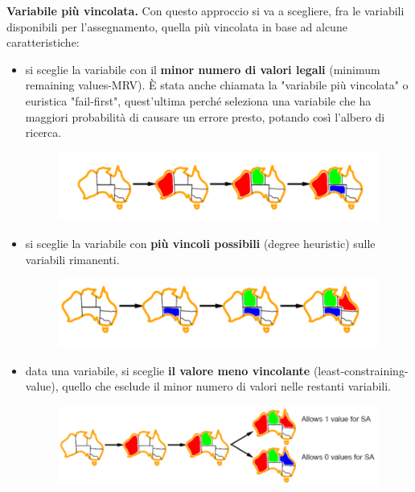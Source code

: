\textbf{Variabile più vincolata.} Con questo approccio si va a scegliere, fra le
variabili disponibili per l'assegnamento, quella più vincolata in base ad alcune
caratteristiche:
\begin{itemize}
    \item si sceglie la variabile con il \textbf{minor numero di valori legali}
          (minimum remaining values-MRV). È stata anche chiamata la "variabile più
          vincolata" o euristica "fail-first", quest'ultima perché seleziona una
          variabile che ha maggiori probabilità di causare un errore presto, potando
          così l'albero di ricerca.
          \begin{figure}[htp]
              \centering
              \includegraphics[width=12cm, keepaspectratio]{img/Cap2/m1.png}
          \end{figure}
    \item si sceglie la variabile con \textbf{più vincoli possibili} (degree
          heuristic) sulle variabili rimanenti.
          \begin{figure}[htp]
              \centering
              \includegraphics[width=12cm, keepaspectratio]{img/Cap2/m2.png}
          \end{figure}
    \item data una variabile, si sceglie \textbf{il valore meno vincolante}
          (least-constraining-value), quello che esclude il minor numero di valori
          nelle restanti variabili.
          \begin{figure}[htp]
              \centering
              \includegraphics[width=12cm, keepaspectratio]{img/Cap2/m3.png}
          \end{figure}
\end{itemize}

